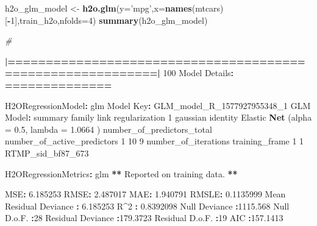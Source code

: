 \documentclass[
]{book}
\newenvironment{Shaded}{\begin{snugshade}}{\end{snugshade}}
\newcommand{\CommentTok}[1]{\textcolor[rgb]{0.56,0.35,0.01}{\textit{#1}}}
\newcommand{\DataTypeTok}[1]{\textcolor[rgb]{0.13,0.29,0.53}{#1}}
\newcommand{\DecValTok}[1]{\textcolor[rgb]{0.00,0.00,0.81}{#1}}
\newcommand{\ErrorTok}[1]{\textcolor[rgb]{0.64,0.00,0.00}{\textbf{#1}}}
\newcommand{\FloatTok}[1]{\textcolor[rgb]{0.00,0.00,0.81}{#1}}
\newcommand{\KeywordTok}[1]{\textcolor[rgb]{0.13,0.29,0.53}{\textbf{#1}}}
\newcommand{\NormalTok}[1]{#1}
\newcommand{\OperatorTok}[1]{\textcolor[rgb]{0.81,0.36,0.00}{\textbf{#1}}}
\newcommand{\StringTok}[1]{\textcolor[rgb]{0.31,0.60,0.02}{#1}}
\begin{document}
\begin{Shaded}
\begin{Highlighting}[]
\NormalTok{h2o_glm_model <-}\StringTok{ }\KeywordTok{h2o.glm}\NormalTok{(}\DataTypeTok{y=}\StringTok{'mpg'}\NormalTok{,}\DataTypeTok{x=}\KeywordTok{names}\NormalTok{(mtcars)[}\OperatorTok{-}\DecValTok{1}\NormalTok{],train_h2o,}\DataTypeTok{nfolds=}\DecValTok{4}\NormalTok{)}
\KeywordTok{summary}\NormalTok{(h2o_glm_model)}

\CommentTok{#}

 \OperatorTok{|}\ErrorTok{===========================================================|}\StringTok{ }\DecValTok{100}\NormalTok{%
\NormalTok{Model Details}\OperatorTok{:}
\ErrorTok{==============}

\NormalTok{H2ORegressionModel}\OperatorTok{:}\StringTok{ }\NormalTok{glm}
\NormalTok{Model Key}\OperatorTok{:}\StringTok{  }\NormalTok{GLM_model_R_}\DecValTok{1577927955348}\NormalTok{_}\DecValTok{1} 
\NormalTok{GLM Model}\OperatorTok{:}\StringTok{ }\NormalTok{summary}
\NormalTok{    family     link                              regularization}
\DecValTok{1}\NormalTok{ gaussian identity Elastic }\KeywordTok{Net}\NormalTok{ (}\DataTypeTok{alpha =} \FloatTok{0.5}\NormalTok{, }\DataTypeTok{lambda =} \FloatTok{1.0664}\NormalTok{ )}
\NormalTok{  number_of_predictors_total number_of_active_predictors}
\DecValTok{1}                         \DecValTok{10}                           \DecValTok{9}
\NormalTok{  number_of_iterations    training_frame}
\DecValTok{1}                    \DecValTok{1}\NormalTok{ RTMP_sid_bf87_}\DecValTok{673}

\NormalTok{H2ORegressionMetrics}\OperatorTok{:}\StringTok{ }\NormalTok{glm}
\OperatorTok{**}\StringTok{ }\NormalTok{Reported on training data. }\OperatorTok{**}

\NormalTok{MSE}\OperatorTok{:}\StringTok{  }\FloatTok{6.185253}
\NormalTok{RMSE}\OperatorTok{:}\StringTok{  }\FloatTok{2.487017}
\NormalTok{MAE}\OperatorTok{:}\StringTok{  }\FloatTok{1.940791}
\NormalTok{RMSLE}\OperatorTok{:}\StringTok{  }\FloatTok{0.1135999}
\NormalTok{Mean Residual Deviance }\OperatorTok{:}\StringTok{  }\FloatTok{6.185253}
\NormalTok{R}\OperatorTok{^}\DecValTok{2} \OperatorTok{:}\StringTok{  }\FloatTok{0.8392098}
\NormalTok{Null Deviance }\OperatorTok{:}\FloatTok{1115.568}
\NormalTok{Null D.o.F. }\OperatorTok{:}\DecValTok{28}
\NormalTok{Residual Deviance }\OperatorTok{:}\FloatTok{179.3723}
\NormalTok{Residual D.o.F. }\OperatorTok{:}\DecValTok{19}
\NormalTok{AIC }\OperatorTok{:}\FloatTok{157.1413}



}
\end{Highlighting}
\end{Shaded}
\end{document}
